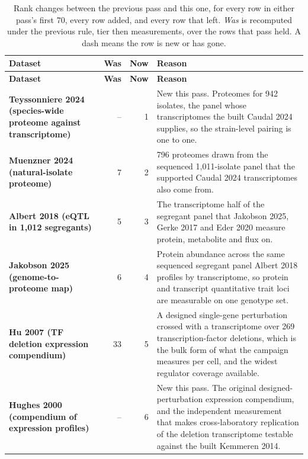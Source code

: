 \begingroup
\footnotesize
\setlength{\tabcolsep}{4pt}
\renewcommand{\arraystretch}{1.15}
\begin{longtable}{@{}L{46mm} r@{\hspace{6pt}} r@{\hspace{6pt}} L{104mm}@{}}
\caption[]{Rank changes between the previous pass and this one, for every row in
either pass's first 70, every row added, and every row that left.
\emph{Was} is recomputed under the previous rule, tier then measurements, over the
rows that pass held. A dash means the row is new or has gone.}
\label{tab:swaps}\\
\toprule
\textbf{Dataset} & \textbf{Was} & \textbf{Now} & \textbf{Reason} \\
\midrule
\endfirsthead
\toprule
\textbf{Dataset} & \textbf{Was} & \textbf{Now} & \textbf{Reason} \\
\midrule
\endhead
\bottomrule
\endfoot
\textbf{Teyssonniere 2024 (species-wide proteome against transcriptome)} & -- & 1 & New this pass. Proteomes for 942 isolates, the panel whose transcriptomes the built Caudal 2024 supplies, so the strain-level pairing is one to one. \\
\addlinespace[5pt]
\textbf{Muenzner 2024 (natural-isolate proteome)} & 7 & 2 & 796 proteomes drawn from the sequenced 1,011-isolate panel that the supported Caudal 2024 transcriptomes also come from. \\
\addlinespace[5pt]
\textbf{Albert 2018 (eQTL in 1,012 segregants)} & 5 & 3 & The transcriptome half of the segregant panel that Jakobson 2025, Gerke 2017 and Eder 2020 measure protein, metabolite and flux on. \\
\addlinespace[5pt]
\textbf{Jakobson 2025 (genome-to-proteome map)} & 6 & 4 & Protein abundance across the same sequenced segregant panel Albert 2018 profiles by transcriptome, so protein and transcript quantitative trait loci are measurable on one genotype set. \\
\addlinespace[5pt]
\textbf{Hu 2007 (TF deletion expression compendium)} & 33 & 5 & A designed single-gene perturbation crossed with a transcriptome over 269 transcription-factor deletions, which is the bulk form of what the campaign measures per cell, and the widest regulator coverage available. \\
\addlinespace[5pt]
\textbf{Hughes 2000 (compendium of expression profiles)} & -- & 6 & New this pass. The original designed-perturbation expression compendium, and the independent measurement that makes cross-laboratory replication of the deletion transcriptome testable against the built Kemmeren 2014. \\

\end{longtable}
